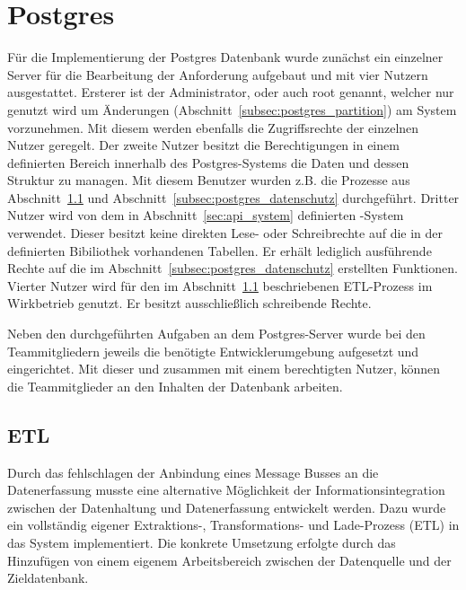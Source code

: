 {\section{Postgres}
Für die Implementierung der Postgres Datenbank wurde zunächst ein einzelner
Server für die Bearbeitung der Anforderung aufgebaut und mit vier Nutzern
ausgestattet. Ersterer ist der Administrator, oder auch root genannt, welcher
nur genutzt wird um Änderungen (Abschnitt~\ref{subsec:postgres_partition}) am
System vorzunehmen. Mit diesem werden ebenfalls die Zugriffsrechte der
einzelnen Nutzer geregelt. Der zweite Nutzer besitzt die Berechtigungen in
einem definierten Bereich innerhalb des Postgres\hyp{}Systems die
Daten und dessen Struktur zu managen. Mit diesem Benutzer wurden z.B. die
Prozesse aus Abschnitt~\ref{subsec:postgres_etl} und
Abschnitt~\ref{subsec:postgres_datenschutz} durchgeführt. Dritter Nutzer wird
von dem in Abschnitt~\ref{sec:api_system} definierten \hyp{}System
verwendet. Dieser besitzt keine direkten Lese\hyp{} oder Schreibrechte auf die
in der definierten Bibiliothek vorhandenen Tabellen. Er erhält lediglich
ausführende Rechte auf die im Abschnitt~\ref{subsec:postgres_datenschutz}
erstellten Funktionen. Vierter Nutzer wird für den im
Abschnitt~\ref{subsec:postgres_etl} beschriebenen ETL\hyp{}Prozess im
Wirkbetrieb genutzt. Er besitzt ausschließlich schreibende Rechte.

Neben den durchgeführten Aufgaben an dem Postgres\hyp{}Server wurde bei den
Teammitgliedern jeweils die benötigte Entwicklerumgebung aufgesetzt und
eingerichtet. Mit dieser und zusammen mit einem berechtigten Nutzer, können die
Teammitglieder an den Inhalten der Datenbank arbeiten.
\nl%

\subsection{ETL}
\label{subsec:postgres_etl}
Durch das fehlschlagen der Anbindung eines Message Busses an die Datenerfassung
musste eine alternative Möglichkeit der Informationsintegration zwischen der
Datenhaltung und Datenerfassung entwickelt werden. Dazu wurde ein vollständig
eigener Extraktions-, Transformations- und Lade-Prozess (ETL) in das System
implementiert. Die konkrete Umsetzung erfolgte durch das Hinzufügen von einem
eigenem Arbeitsbereich zwischen der Datenquelle und der Zieldatenbank.

}
